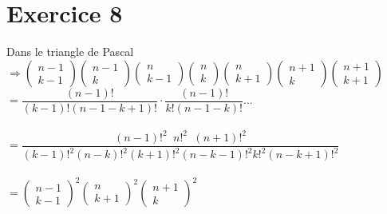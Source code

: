 \documentclass[fontsize=10pt]{article}
\begin{document}
\section*{Exercice 8}
Dans le triangle de Pascal\\
$\Rightarrow
\begin{pmatrix} 
n-1\\
k-1
\end{pmatrix}
\begin{pmatrix} 
n-1\\
k
\end{pmatrix}
\begin{pmatrix} 
n\\
k-1
\end{pmatrix}
\begin{pmatrix} 
n\\
k
\end{pmatrix}
\begin{pmatrix} 
n\\
k+1
\end{pmatrix}
\begin{pmatrix} 
n+1\\
k
\end{pmatrix}
\begin{pmatrix} 
n+1\\
k+1
\end{pmatrix}$\\
$=\dfrac{(n-1)!}{(k-1)!(n-1-k+1)!} \cdot \dfrac{(n-1)!}{k!(n-1-k)!}\dots$\\\\
$=\dfrac{(n-1)!^2\phantom{a}n!^2\phantom{a} (n+1)!^2}{(k-1)!^2(n-k)!^2(k+1)!^2(n-k-1)!^2k!^2(n-k+1)!^2}$\\\\
$=
\begin{pmatrix} 
n-1\\
k-1
\end{pmatrix}^2
\begin{pmatrix} 
n\\
k+1
\end{pmatrix}^2
\begin{pmatrix} 
n+1\\
k
\end{pmatrix}^2$
\end{document}
